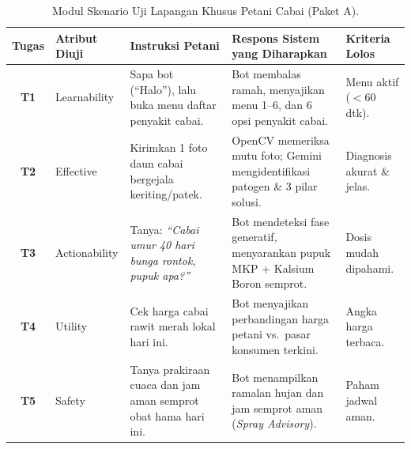 \documentclass[11pt,a4paper]{article}
\begin{document}
\begin{table}[htbp]
\centering
\small
\caption{Modul Skenario Uji Lapangan Khusus Petani Cabai (Paket A).}
\label{tab:skenario_cabai_lengkap}
\begin{tabularx}{\textwidth}{c l X X l}
\toprule
\textbf{Tugas} & \textbf{Atribut Diuji} & \textbf{Instruksi Petani} & \textbf{Respons Sistem yang Diharapkan} & \textbf{Kriteria Lolos} \\
\midrule
\textbf{T1} & Learnability & Sapa bot (``Halo''), lalu buka menu daftar penyakit cabai. & Bot membalas ramah, menyajikan menu 1--6, dan 6 opsi penyakit cabai. & Menu aktif ($< 60$ dtk). \\
\textbf{T2} & Effective & Kirimkan 1 foto daun cabai bergejala keriting/patek. & OpenCV memeriksa mutu foto; Gemini mengidentifikasi patogen \& 3 pilar solusi. & Diagnosis akurat \& jelas. \\
\textbf{T3} & Actionability & Tanya: \textit{``Cabai umur 40 hari bunga rontok, pupuk apa?''} & Bot mendeteksi fase generatif, menyarankan pupuk MKP + Kalsium Boron semprot. & Dosis mudah dipahami. \\
\textbf{T4} & Utility & Cek harga cabai rawit merah lokal hari ini. & Bot menyajikan perbandingan harga petani vs.\ pasar konsumen terkini. & Angka harga terbaca. \\
\textbf{T5} & Safety & Tanya prakiraan cuaca dan jam aman semprot obat hama hari ini. & Bot menampilkan ramalan hujan dan jam semprot aman (\textit{Spray Advisory}). & Paham jadwal aman. \\
\bottomrule
\end{tabularx}
\end{table}
\end{document}
